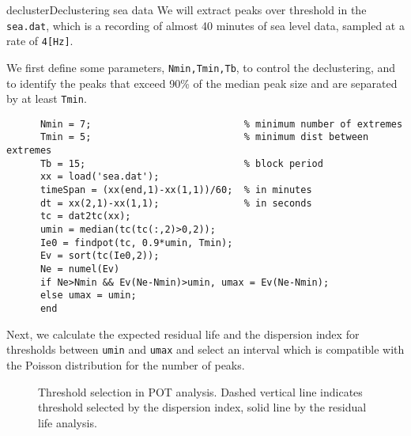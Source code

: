 \begin{rtex}{decluster}{Declustering sea data}
We will extract peaks over threshold in the {\tt sea.dat}, which is
a recording of almost 40 minutes of sea level data, sampled at a rate
of {\tt 4[Hz]}.

We first define some parameters, {\tt Nmin,Tmin,Tb}, to control
the declustering, and to identify the peaks that exceed 90\% of
the median peak size and are separated by at least {\tt Tmin}.
{\small\begin{verbatim}
      Nmin = 7;                           % minimum number of extremes
      Tmin = 5;                           % minimum dist between extremes
      Tb = 15;                            % block period
      xx = load('sea.dat');
      timeSpan = (xx(end,1)-xx(1,1))/60;  % in minutes
      dt = xx(2,1)-xx(1,1);               % in seconds
      tc = dat2tc(xx);
      umin = median(tc(tc(:,2)>0,2));
      Ie0 = findpot(tc, 0.9*umin, Tmin);
      Ev = sort(tc(Ie0,2));
      Ne = numel(Ev)
      if Ne>Nmin && Ev(Ne-Nmin)>umin, umax = Ev(Ne-Nmin);
      else umax = umin;
      end
\end{verbatim}} 
Next, we calculate the expected residual life and the
dispersion index for thresholds between
{\tt umin} and {\tt umax} and select an interval which is
compatible with the Poisson distribution for the number of peaks.

\begin{figure}
%
\hfill
{}
\vspace{-3mm}
\caption[Threshold selection in POT analysis]{Threshold selection
in POT analysis. Dashed vertical line indicates threshold selected by the
dispersion index, solid line by the residual life analysis.}
\label{fig:thresholds}
\end{figure}


\end{rtex}
